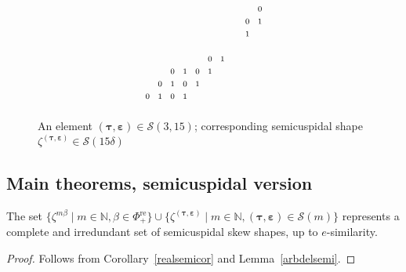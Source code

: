 \documentclass[Unicode,ALCO]{cedram}
\newcommand{\SSSS}{\mathcal{S}}
\newcommand{\SSSSS}{\boldsymbol{\mathcal{S}}}
\newcommand{\0}{{\bar 0}}
\newcommand{\NN}{{\mathbb N}}
\newcommand{\btau}{\boldsymbol{\tau}}
\newcommand{\bbep}{\boldsymbol{\varepsilon}}
\def\re{{\mathrm{re}}}
\begin{document}
\begin{exam}
\begin{figure}
\begin{align*}
{\begin{tikzpicture}[scale=0.4]
\node at (6.5,7.5){$\scriptstyle0 $};
\node at (7.5,7.5){$\scriptstyle1 $};
\node at (8.5,7.5){$\scriptstyle0 $};
\node at (9.5,7.5){$\scriptstyle1 $};
\node at (6.5+1,7.5+1){$\scriptstyle0 $};
\node at (7.5+1,7.5+1){$\scriptstyle1 $};
\node at (8.5+1,7.5+1){$\scriptstyle0 $};
\node at (9.5+1,7.5+1){$\scriptstyle1 $};
\node at (6.5+2,7.5+2){$\scriptstyle0 $};
\node at (7.5+2,7.5+2){$\scriptstyle1 $};
\node at (8.5+2,7.5+2){$\scriptstyle0 $};
\node at (9.5+2,7.5+2){$\scriptstyle1 $};
\node at (8.5+3,7.5+3){$\scriptstyle0 $};
\node at (9.5+3,7.5+3){$\scriptstyle1 $};
\node at (14.5,12.5){$\scriptstyle1 $};
\node at (14.5,13.5){$\scriptstyle0 $};
\node at (14.5+1,12.5+1){$\scriptstyle1 $};
\node at (14.5+1,13.5+1){$\scriptstyle0 $};
\end{tikzpicture}
}
\end{align*}
\caption{An element \((\btau, \bbep) \in \SSSSS(3,15)\); corresponding semicuspidal shape \(\zeta^{(\btau, \bbep)} \in \SSSS(15\delta)\)
}
\label{fig:e2dil}       
\end{figure}

\end{exam}


\subsection{Main theorems, semicuspidal version}

\begin{theorem}\label{allsemicusp}
The set \(\{\zeta^{m \beta} \mid m \in \NN, \beta \in \Phi_+^\re\} \cup \{ \zeta^{(\btau, \bbep)} \mid m \in \NN, (\btau, \bbep) \in \SSSSS(m)\}\) represents a complete and irredundant set of semicuspidal skew shapes, up to \(e\)-similarity.
\end{theorem}
\begin{proof}
Follows from Corollary~\ref{realsemicor} and Lemma~\ref{arbdelsemi}.
\end{proof}
\end{document}
